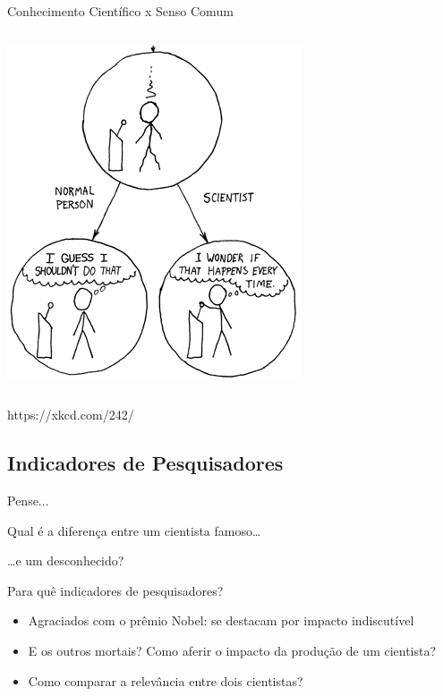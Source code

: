 \documentclass{beamer}
\begin{document}
\begin{frame}{Conhecimento Científico x Senso Comum}
\begin{columns}
\begin{column}{5cm}
\begin{center}
\begin{center}
          \includegraphics[width=\textwidth]{Intro/the_difference2}
        \end{center}
      \end{center}
    \end{column}
  \end{columns}

https://xkcd.com/242/
\end{frame}

\subsection{Indicadores de Pesquisadores}

\begin{frame}{Pense...}
  \begin{center}
    Qual é a diferença entre um cientista famoso\ldots

    \bigskip
    \ldots e um desconhecido?
  \end{center}
\end{frame}

\begin{frame}{Para quê indicadores de pesquisadores?}
  \begin{itemize}
    \footnotesize
  \item Agraciados com o prêmio Nobel: se destacam por impacto indiscutível
    \bigskip
  \item E os outros mortais? Como aferir o impacto da produção de um cientista?
    \bigskip
  \item Como comparar a relevância entre dois cientistas?
  \end{itemize}
\end{frame}
\end{document}
